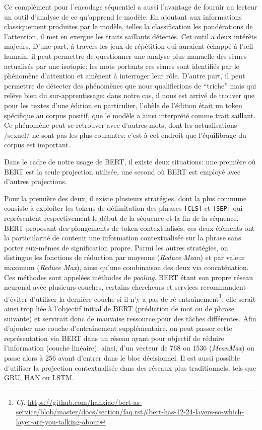 Ce complément pour l'encodage séquentiel a aussi l'avantage de fournir au lecteur un outil d'analyse de ce qu'apprend le modèle. En ajoutant aux informations classiquement produites par le modèle, telles la classification les pondérations de l'attention, il met en exergue les traits saillants détectés. Cet outil a deux intérêts majeurs. D'une part, à travers les jeux de répétition qui auraient échappé à l'œil humain, il peut permettre de questionner une analyse plus manuelle des sèmes actualisés par une isotopie: les mots portants ces sèmes sont identifiés par le phénomène d'attention et amènent à interroger leur rôle. D'autre part, il peut permettre de détecter des phénomènes que nous qualifierions de \enquote{triche} mais qui relève bien du sur-apprentissage: dans notre cas, il nous est arrivé de trouver que pour les textes d'une édition en particulier, l'obèle de l'édition était un token spécifique au corpus positif, que le modèle a ainsi interprété comme trait saillant. Ce phénomène peut se retrouver avec d'autres mots, dont les actualisations /sexuel/ ne sont pas les plus courantes: c'est à cet endroit que l'équilibrage du corpus est important.

Dans le cadre de notre usage de BERT, il existe deux situations: une première où BERT est la seule projection utilisée, une second où BERT est employé avec d'autres projections.

Pour la première des deux, il existe plusieurs stratégies, dont la plus commune consiste à exploiter les tokens de délimitation des phrases \texttt{[CLS]} et \texttt{[SEP]} qui représentent respectivement le début de la séquence et la fin de la séquence. BERT proposant des plongements de token contextualisés, ces deux éléments ont la particularité de contenir une information contextualisée sur la phrase sans porter eux-mêmes de signification propre. Parmi les autres stratégies, on distingue les fonctions de réduction par moyenne (\textit{Reduce Mean}) et par valeur maximum (\textit{Reduce Max}), ainsi qu'une combinaison des deux via concaténation. Ces méthodes sont appelées méthodes de \textit{pooling}. BERT étant son propre réseau neuronal avec plusieurs couches, certains chercheurs et services recommandent d'éviter d'utiliser la dernière couche si il n'y a pas de ré-entraînement\footnote{\textit{Cf.} \url{https://github.com/hanxiao/bert-as-service/blob/master/docs/section/faq.rst\#bert-has-12-24-layers-so-which-layer-are-you-talking-about}}: elle serait ainsi trop liée à l'objectif initial de BERT (prédiction de mot ou de phrase suivante) et servirait donc de mauvaise ressource pour des tâches différentes. Afin d'ajouter une couche d'entraînement supplémentaire, on peut passer cette représentation via BERT dans un réseau ayant pour objectif de réduire l'information (couche linéaire): ainsi, d'un vecteur de 768 ou 1536 (\textit{MeanMax}) on passe alors à 256 avant d'entrer dans le bloc décisionnel. Il est aussi possible d'utiliser la projection contextualisée dans des réseaux plus traditionnels, tels que GRU, HAN ou LSTM.

